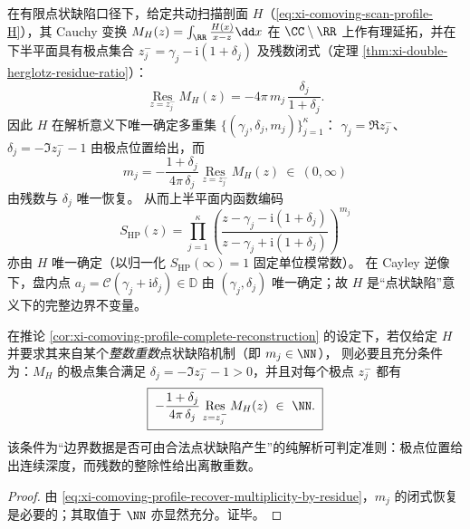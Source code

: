 \begin{corollary}\label{cor:xi-comoving-profile-complete-reconstruction}
在有限点状缺陷口径下，给定共动扫描剖面 \(H\)（\eqref{eq:xi-comoving-scan-profile-H}），其 Cauchy 变换
\(
M_H(z)=\int_{\RR}\frac{H(x)}{x-z}\dd x
\)
在 \(\CC\setminus\RR\) 上作有理延拓，并在下半平面具有极点集合
\(
z_j^-=\gamma_j-\mathrm{i}(1+\delta_j)
\)
及残数闭式（定理 \ref{thm:xi-double-herglotz-residue-ratio}）：
\[
\operatorname*{Res}_{z=z_j^-} M_H(z)= -4\pi\,m_j\,\frac{\delta_j}{1+\delta_j}.
\]
因此 \(H\) 在解析意义下唯一确定多重集 \(\{(\gamma_j,\delta_j,m_j)\}_{j=1}^{\kappa}\)：
\(\gamma_j=\Re z_j^-\)、\(\delta_j=-\Im z_j^- -1\) 由极点位置给出，而
\begin{equation}\label{eq:xi-comoving-profile-recover-multiplicity-by-residue}
\boxed{\;
m_j
=
-\frac{1+\delta_j}{4\pi\,\delta_j}\operatorname*{Res}_{z=z_j^-} M_H(z)\ \in\ (0,\infty)\;}
\end{equation}
由残数与 \(\delta_j\) 唯一恢复。
从而上半平面内函数编码
\[
S_{\mathrm{HP}}(z)=\prod_{j=1}^{\kappa}\left(\frac{z-\gamma_j-\mathrm{i}(1+\delta_j)}{z-\gamma_j+\mathrm{i}(1+\delta_j)}\right)^{m_j}
\]
亦由 \(H\) 唯一确定（以归一化 \(S_{\mathrm{HP}}(\infty)=1\) 固定单位模常数）。
在 Cayley 逆像下，盘内点
\(
a_j=\mathcal{C}(\gamma_j+\mathrm{i}\delta_j)\in\mathbb{D}
\)
由 \((\gamma_j,\delta_j)\) 唯一确定；故 \(H\) 是“点状缺陷”意义下的完整边界不变量。
\end{corollary}

\begin{corollary}\label{cor:xi-comoving-profile-integrality-test}
在推论 \ref{cor:xi-comoving-profile-complete-reconstruction} 的设定下，若仅给定 \(H\) 并要求其来自某个\emph{整数重数}点状缺陷机制（即 \(m_j\in\NN\)），
则必要且充分条件为：\(M_H\) 的极点集合满足 \(\delta_j=-\Im z_j^- -1>0\)，并且对每个极点 \(z_j^-\) 都有
\[
\boxed{\;
-\frac{1+\delta_j}{4\pi\,\delta_j}\operatorname*{Res}_{z=z_j^-} M_H(z)\ \in\ \NN.\;}
\]
该条件为“边界数据是否可由合法点状缺陷产生”的纯解析可判定准则：极点位置给出连续深度，而残数的整除性给出离散重数。
\end{corollary}

\begin{proof}
由 \eqref{eq:xi-comoving-profile-recover-multiplicity-by-residue}，\(m_j\) 的闭式恢复是必要的；其取值于 \(\NN\) 亦显然充分。证毕。
\end{proof}

